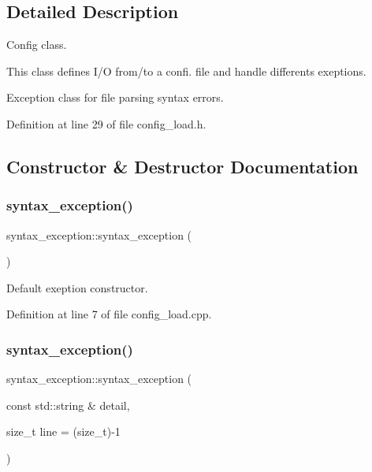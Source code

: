 \subsection{Detailed Description}
Config class. 

This class defines I/O from/to a confi. file and handle differents exeptions.

Exception class for file parsing syntax errors. 

Definition at line 29 of file config\+\_\+load.\+h.



\subsection{Constructor \& Destructor Documentation}
\hypertarget{classsyntax__exception_a60278cf3cd3eba72c35f27ee36a21d68}{}\label{classsyntax__exception_a60278cf3cd3eba72c35f27ee36a21d68} 
\subsubsection{\texorpdfstring{syntax\+\_\+exception()}{syntax\_exception()}\hspace{0.1cm}{\footnotesize\ttfamily [1/2]}}
{\footnotesize\ttfamily syntax\+\_\+exception\+::syntax\+\_\+exception (\begin{DoxyParamCaption}{ }\end{DoxyParamCaption})}



Default exeption constructor. 



Definition at line 7 of file config\+\_\+load.\+cpp.

\hypertarget{classsyntax__exception_aff5164bb18c155255820187afa2215c9}{}\label{classsyntax__exception_aff5164bb18c155255820187afa2215c9} 
\subsubsection{\texorpdfstring{syntax\+\_\+exception()}{syntax\_exception()}\hspace{0.1cm}{\footnotesize\ttfamily [2/2]}}
{\footnotesize\ttfamily syntax\+\_\+exception\+::syntax\+\_\+exception (\begin{DoxyParamCaption}\item[{const std\+::string \&}]{detail,  }\item[{size\+\_\+t}]{line = {\ttfamily (size\+\_\+t)-\/1} }\end{DoxyParamCaption})}



